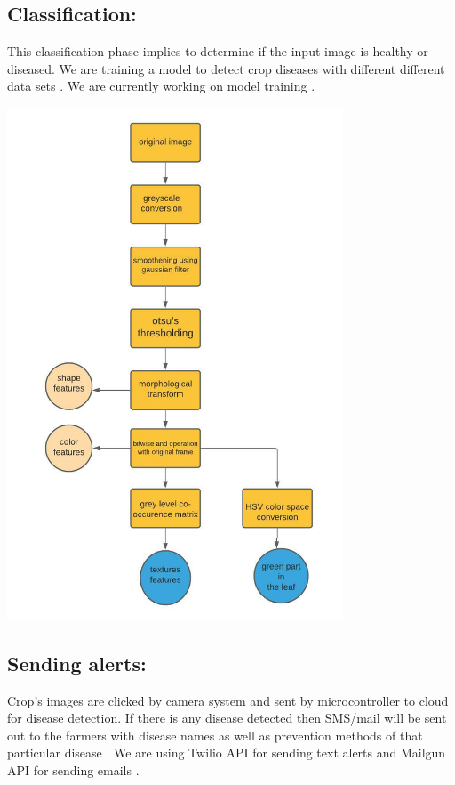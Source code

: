 \documentclass{article}
\begin{document}
\subsection{Classification:} This classification  phase  implies  to  determine  if the input image is healthy or diseased. We are training a model to detect crop diseases with different different data sets . We are currently working on model training .

 
\begin{center}
\includegraphics[width=10cm]{pics/class.jpeg}
\end{center}



\subsection{Sending alerts:}  Crop’s images are clicked by camera system and sent by microcontroller to cloud for disease detection.  If there is any disease detected then SMS/mail will be sent out to the farmers with disease names as well as prevention methods of that particular disease . We are using Twilio API for sending text alerts and Mailgun API for sending emails .\\
\end{document}

